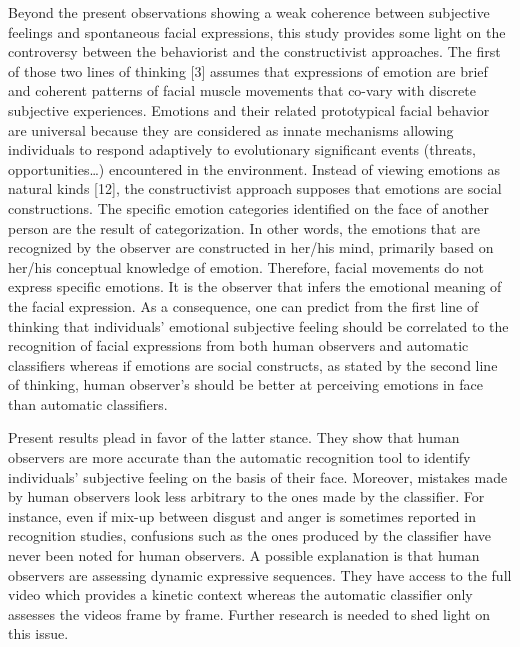 \documentclass[conference,final,]{IEEEtran}
\begin{document}
Beyond the present observations showing a weak coherence between
subjective feelings and spontaneous facial expressions, this study
provides some light on the controversy between the behaviorist and the
constructivist approaches. The first of those two lines of thinking
{[}3{]} assumes that expressions of emotion are brief and coherent
patterns of facial muscle movements that co-vary with discrete
subjective experiences. Emotions and their related prototypical facial
behavior are universal because they are considered as innate mechanisms
allowing individuals to respond adaptively to evolutionary significant
events (threats, opportunities\ldots{}) encountered in the environment.
Instead of viewing emotions as natural kinds {[}12{]}, the
constructivist approach supposes that emotions are social constructions.
The specific emotion categories identified on the face of another person
are the result of categorization. In other words, the emotions that are
recognized by the observer are constructed in her/his mind, primarily
based on her/his conceptual knowledge of emotion. Therefore, facial
movements do not express specific emotions. It is the observer that
infers the emotional meaning of the facial expression. As a consequence,
one can predict from the first line of thinking that individuals'
emotional subjective feeling should be correlated to the recognition of
facial expressions from both human observers and automatic classifiers
whereas if emotions are social constructs, as stated by the second line
of thinking, human observer's should be better at perceiving emotions in
face than automatic classifiers.

Present results plead in favor of the latter stance. They show that
human observers are more accurate than the automatic recognition tool to
identify individuals' subjective feeling on the basis of their face.
Moreover, mistakes made by human observers look less arbitrary to the
ones made by the classifier. For instance, even if mix-up between
disgust and anger is sometimes reported in recognition studies,
confusions such as the ones produced by the classifier have never been
noted for human observers. A possible explanation is that human
observers are assessing dynamic expressive sequences. They have access
to the full video which provides a kinetic context whereas the automatic
classifier only assesses the videos frame by frame. Further research is
needed to shed light on this issue.
\end{document}

